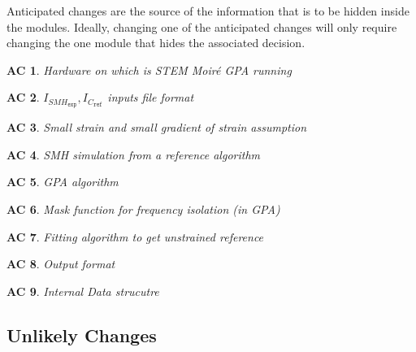 \documentclass[12pt, titlepage]{article}
\newcommand{\progname}{STEM Moir{\'e} GPA}
\newtheorem{AC}{AC}
\begin{document}
Anticipated changes are the source of the information that is to be hidden
inside the modules. Ideally, changing one of the anticipated changes will only
require changing the one module that hides the associated decision. 

\begin{AC}\normalfont Hardware on which is \progname{} running
\label{AC_Hardware}
\end{AC}

\begin{AC}\normalfont 
$I_{\mathit{SMH}_{\texttt{exp}}},I_{\mathit{C}_{\texttt{ref}}}$ inputs file 
format
\label{AC_FormatFile}
\end{AC}

\begin{AC}\normalfont Small strain and small gradient of strain assumption
\label{AC_Assum_SmallStrain}
\end{AC}

\begin{AC}\normalfont SMH simulation from a reference algorithm
\label{AC_SMH_algo}
\end{AC}

\begin{AC}\normalfont GPA algorithm
\label{AC_GPA_algo}
\end{AC}

\begin{AC}\normalfont Mask function for frequency isolation (in GPA)
\label{AC_Mask}
\end{AC}

\begin{AC}\normalfont Fitting algorithm to get unstrained reference 
\label{AC_RefFit}
\end{AC}

\begin{AC}\normalfont Output format
\label{AC_Output}
\end{AC}

\begin{AC}\normalfont Internal Data strucutre
\label{AC_Data}
\end{AC}

\subsection{Unlikely Changes} \label{SecUchange}
\end{document}
